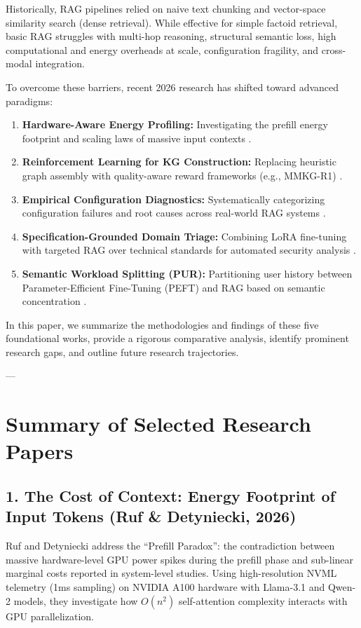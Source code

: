 \documentclass[10pt,journal,compsoc]{IEEEtran}
\begin{document}
Historically, RAG pipelines relied on naive text chunking and vector-space similarity search (dense retrieval). While effective for simple factoid retrieval, basic RAG struggles with multi-hop reasoning, structural semantic loss, high computational and energy overheads at scale, configuration fragility, and cross-modal integration. 

To overcome these barriers, recent 2026 research has shifted toward advanced paradigms:
\begin{enumerate}
    \item \textbf{Hardware-Aware Energy Profiling:} Investigating the prefill energy footprint and scaling laws of massive input contexts \cite{ruf2026cost}.
    \item \textbf{Reinforcement Learning for KG Construction:} Replacing heuristic graph assembly with quality-aware reward frameworks (e.g., MMKG-R1) \cite{wu2026mmkg}.
    \item \textbf{Empirical Configuration Diagnostics:} Systematically categorizing configuration failures and root causes across real-world RAG systems \cite{chen2026configuring}.
    \item \textbf{Specification-Grounded Domain Triage:} Combining LoRA fine-tuning with targeted RAG over technical standards for automated security analysis \cite{mishra2026autosec}.
    \item \textbf{Semantic Workload Splitting (PUR):} Partitioning user history between Parameter-Efficient Fine-Tuning (PEFT) and RAG based on semantic concentration \cite{yang2026fast}.
\end{enumerate}

In this paper, we summarize the methodologies and findings of these five foundational works, provide a rigorous comparative analysis, identify prominent research gaps, and outline future research trajectories.

---

\section{Summary of Selected Research Papers}

\subsection{1. The Cost of Context: Energy Footprint of Input Tokens (Ruf \& Detyniecki, 2026)}
Ruf and Detyniecki \cite{ruf2026cost} address the ``Prefill Paradox'': the contradiction between massive hardware-level GPU power spikes during the prefill phase and sub-linear marginal costs reported in system-level studies. Using high-resolution NVML telemetry (1ms sampling) on NVIDIA A100 hardware with Llama-3.1 and Qwen-2 models, they investigate how $O(n^2)$ self-attention complexity interacts with GPU parallelization.
\end{document}

